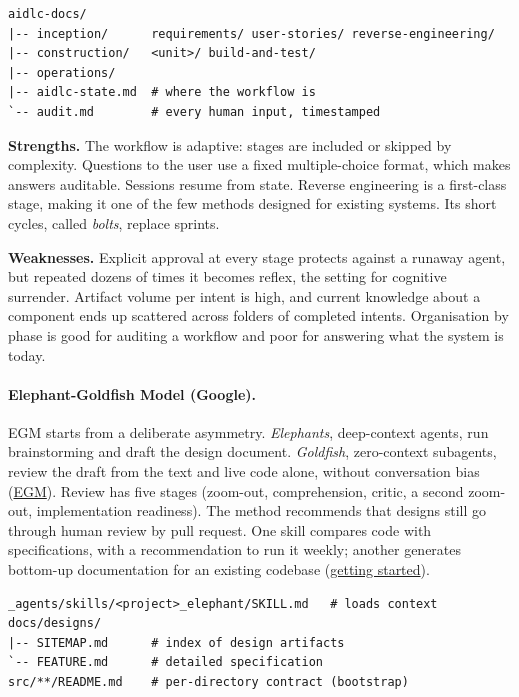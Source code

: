 \documentclass[11pt]{article}
\begin{document}
\begin{verbatim}
aidlc-docs/
|-- inception/      requirements/ user-stories/ reverse-engineering/
|-- construction/   <unit>/ build-and-test/
|-- operations/
|-- aidlc-state.md  # where the workflow is
`-- audit.md        # every human input, timestamped
\end{verbatim}

\textbf{Strengths.} The workflow is adaptive: stages are included or skipped by complexity. Questions to the user use a fixed multiple-choice format, which makes answers auditable. Sessions resume from state. Reverse engineering is a first-class stage, making it one of the few methods designed for existing systems. Its short cycles, called \emph{bolts}, replace sprints.

\textbf{Weaknesses.} Explicit approval at every stage protects against a runaway agent, but repeated dozens of times it becomes reflex, the setting for cognitive surrender. Artifact volume per intent is high, and current knowledge about a component ends up scattered across folders of completed intents. Organisation by phase is good for auditing a workflow and poor for answering what the system is today.

\paragraph{Elephant-Goldfish Model (Google).} EGM starts from a deliberate asymmetry. \emph{Elephants}, deep-context agents, run brainstorming and draft the design document. \emph{Goldfish}, zero-context subagents, review the draft from the text and live code alone, without conversation bias (\href{https://egm.dev/}{EGM}). Review has five stages (zoom-out, comprehension, critic, a second zoom-out, implementation readiness). The method recommends that designs still go through human review by pull request. One skill compares code with specifications, with a recommendation to run it weekly; another generates bottom-up documentation for an existing codebase (\href{https://github.com/google/elephant-goldfish-model/blob/main/docs/getting_started.md}{getting started}).

\begin{verbatim}
_agents/skills/<project>_elephant/SKILL.md   # loads context
docs/designs/
|-- SITEMAP.md      # index of design artifacts
`-- FEATURE.md      # detailed specification
src/**/README.md    # per-directory contract (bootstrap)
\end{verbatim}
\end{document}
